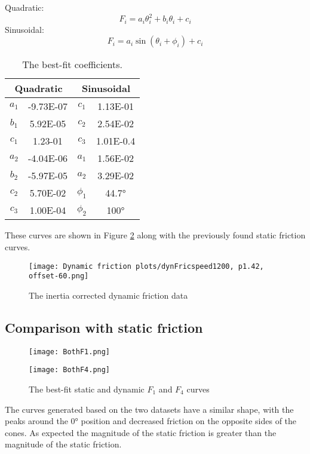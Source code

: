 \documentclass[12pt]{article}
\begin{document}
Quadratic:
$$F_i = a_i \theta_i^2 + b_i \theta_i + c_i$$
Sinusoidal:
$$F_i = a_i \sin\left( \theta_i + \phi_i  \right)  + c_i$$

 
\begin{table}[h]
    \centering
\begin{tabular}{|c|c|c|c|}
\hline
\multicolumn{2}{|c|}{Quadratic}     & \multicolumn{2}{|c|}{Sinusoidal}    \\ \hline
$a_1$        & -9.73E-07 & $c_1$         & 1.13E-01 \\ \hline
$b_1$        & 5.92E-05  & $c_2$         & 2.54E-02 \\ \hline
$c_1$        & 1.23-01  & $c_3$         & 1.01E-0.4 \\ \hline
$a_2$        & -4.04E-06 & $a_1$         & 1.56E-02 \\ \hline
$b_2$        & -5.97E-05 & $a_2$         & 3.29E-02 \\ \hline
$c_2$        & 5.70E-02  & $\phi_1$         & 44.7°\\ \hline
$c_3$        & 1.00E-04  & $\phi_2$         & 100° \\ \hline
\end{tabular}
    \caption{The best-fit coefficients.}
    \label{tab:dynFricCoeffs}
\end{table}
These curves are shown in Figure \ref{fig:dynFitCurves} along with the previously found static friction curves.

\begin{figure}
    \centering
    \texttt{[image: Dynamic friction plots/dynFricspeed1200, p1.42, offset-60.png]}
    \caption{The inertia corrected dynamic friction data }
    \label{fig:dynFricDataCollected}
\end{figure}


\subsection{Comparison with static friction}
\begin{figure}[!h]
    \centering
    \begin{minipage}{0.49\textwidth}       
         \texttt{[image: BothF1.png]}
    \end{minipage}
    \begin{minipage}{0.49\textwidth}       
         \texttt{[image: BothF4.png]}
    \end{minipage}
\label{fig:dynFitCurves}
\caption{The best-fit static and dynamic $F_1$ and $F_4$ curves}

\end{figure}
The curves generated based on the two datasets have a similar shape, with the peaks around the 0° position and decreased friction on the opposite sides of the cones. As expected the magnitude of the static friction is greater than the magnitude of the static friction. 
\end{document}
